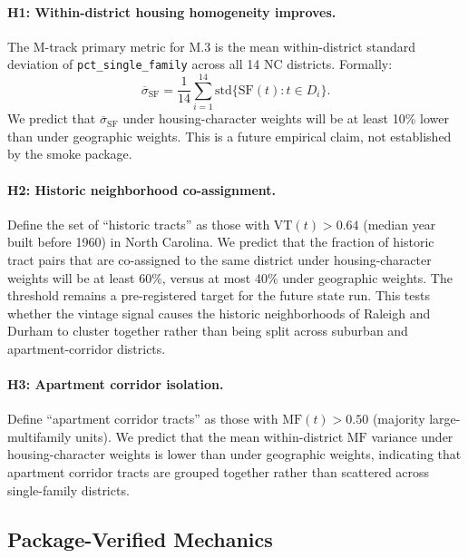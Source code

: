 \paragraph{H1: Within-district housing homogeneity improves.}
The M-track primary metric for M.3 is the mean within-district standard
deviation of \texttt{pct\_single\_family} across all 14 NC districts.
Formally:
\begin{equation}
  \overline{\sigma}_{\mathrm{SF}}
  = \frac{1}{14} \sum_{i=1}^{14}
    \mathrm{std}\bigl\{\mathrm{SF}(t) : t \in D_i\bigr\}.
  \label{eq:within-sf}
\end{equation}
We predict that $\overline{\sigma}_{\mathrm{SF}}$ under housing-character weights
will be at least 10\% lower than under geographic weights. This is a future
empirical claim, not established by the smoke package.

\paragraph{H2: Historic neighborhood co-assignment.}
Define the set of ``historic tracts'' as those with $\mathrm{VT}(t) > 0.64$
(median year built before 1960) in North Carolina.
We predict that the fraction of historic tract pairs that are co-assigned to
the same district under housing-character weights will be at least 60\%,
versus at most 40\% under geographic weights. The threshold remains a
pre-registered target for the future state run.
This tests whether the vintage signal causes the historic neighborhoods of
Raleigh and Durham to cluster together rather than being split across suburban
and apartment-corridor districts.

\paragraph{H3: Apartment corridor isolation.}
Define ``apartment corridor tracts'' as those with $\mathrm{MF}(t) > 0.50$
(majority large-multifamily units).
We predict that the mean within-district $\mathrm{MF}$ variance under
housing-character weights is lower than under geographic weights,
indicating that apartment corridor tracts are grouped together rather than
scattered across single-family districts.

\subsection{Package-Verified Mechanics}

